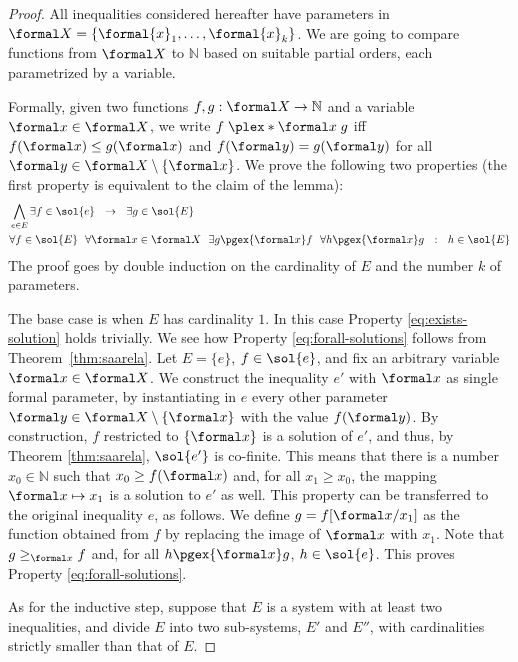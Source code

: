 \documentclass{article}
\providecommand{\AP}{}\NewDocumentCommand{\reintro}{o m}{#2}
\begin{document}
\begin{proof}
All inequalities considered hereafter have 
parameters in $\formal X=\{\formal{x}_1,\dots,\formal{x}_k\}$.
We are going to compare functions from $\formal X$ to $\mathbb{N}$
based on suitable partial orders, each parametrized by a variable. 
\AP
Formally, given two functions $f,g:\formal X\rightarrow\mathbb{N}$
and a variable $\formal x\in\formal X$, we write 
$f \mathrel{\plex*{\formal x}} g$ 
iff $f(\formal x) \le g(\formal x)$ and $f(\formal y) = g(\formal y)$ 
for all $\formal y\in\formal X\setminus\{\formal x\}$.
We prove the following two properties (the first property is equivalent to 
the claim of the lemma):
\begin{align}
  &\bigwedge_{e\in E}
    \exists f \in \sol{e}
    ~~\rightarrow~~
   \exists g \in \sol{E}
  \label{eq:exists-solution}
  \\
  &\forall f \in \sol{E} ~~
  \forall \formal x\in\formal X ~~
  \exists g \pgex{\formal x} f ~~
  \forall h \pgex{\formal x} g ~~:~~
  h \in \sol{E} 
  \label{eq:forall-solutions}
\end{align}
The proof goes by  double induction on the cardinality of $E$ 
and the number $k$ of parameters.

The base case is when $E$ has cardinality $1$.
In this case Property \eqref{eq:exists-solution} holds trivially.
We see how Property \eqref{eq:forall-solutions} follows from Theorem~\ref{thm:saarela}.
Let $E=\{e\}$, $f\in\sol{e}$, and fix an arbitrary variable $\formal x\in\formal X$.
We construct the inequality $e'$ with $\formal x$ as single formal parameter, by 
instantiating in $e$ every other parameter $\formal y\in\formal X\setminus\{\formal x\}$
with the value $f(\formal y)$. 
By construction, $f$ restricted to $\{\formal x\}$ is a solution of $e'$, and thus, 
by Theorem \ref{thm:saarela}, $\sol{e'}$ is co-finite. 
This means that there is a number $x_0\in\mathbb{N}$ such that $x_0 \ge f(\formal x)$ 
and, for all $x_1 \ge x_0$, the mapping $\formal x\mapsto x_1$ is a solution to $e'$ as well.
This property can be transferred to the original inequality $e$, as follows.
We define $g = f[\formal x / x_1]$ as the function obtained from $f$ by replacing
the image of $\formal x$ with $x_1$. Note that $g \ge_{\formal x} f$ and,
for all $h \pgex{\formal x} g$, $h\in\sol{e}$. This proves Property \eqref{eq:forall-solutions}.

As for the inductive step, suppose that $E$ is a system with at least two inequalities,
and divide $E$ into two sub-systems, $E'$ and $E''$, with cardinalities strictly 
smaller than that of $E$.


\end{proof}
\end{document}
